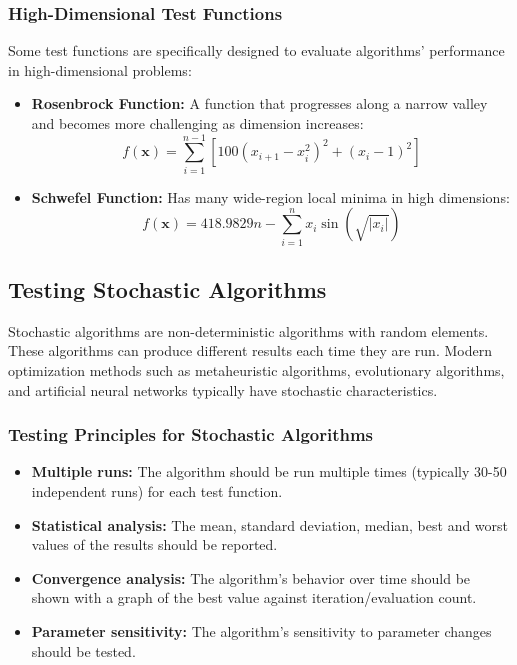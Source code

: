 \subsubsection{High-Dimensional Test Functions}

Some test functions are specifically designed to evaluate algorithms' performance in high-dimensional problems:

\begin{itemize}
    \item \textbf{Rosenbrock Function:} A function that progresses along a narrow valley and becomes more challenging as dimension increases:
    \begin{equation}
        f(\mathbf{x}) = \sum_{i=1}^{n-1} \left[ 100(x_{i+1} - x_i^2)^2 + (x_i - 1)^2 \right]
    \end{equation}
    
    \item \textbf{Schwefel Function:} Has many wide-region local minima in high dimensions:
    \begin{equation}
        f(\mathbf{x}) = 418.9829n - \sum_{i=1}^{n} x_i\sin(\sqrt{|x_i|})
    \end{equation}
\end{itemize}

\subsection{Testing Stochastic Algorithms}

Stochastic algorithms are non-deterministic algorithms with random elements. These algorithms can produce different results each time they are run. Modern optimization methods such as metaheuristic algorithms, evolutionary algorithms, and artificial neural networks typically have stochastic characteristics.

\subsubsection{Testing Principles for Stochastic Algorithms}

\begin{itemize}
    \item \textbf{Multiple runs:} The algorithm should be run multiple times (typically 30-50 independent runs) for each test function.
    
    \item \textbf{Statistical analysis:} The mean, standard deviation, median, best and worst values of the results should be reported.
    
    \item \textbf{Convergence analysis:} The algorithm's behavior over time should be shown with a graph of the best value against iteration/evaluation count.
    
    \item \textbf{Parameter sensitivity:} The algorithm's sensitivity to parameter changes should be tested.
\end{itemize}

